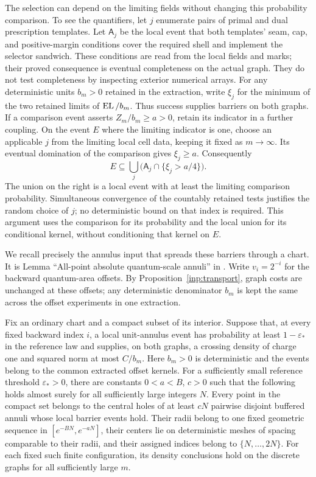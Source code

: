 The selection can depend on the limiting fields without changing
this probability comparison.  To see the quantifiers, let $j$
enumerate pairs of primal and dual prescription templates.  Let
$\mathsf A_j$ be the local event that both templates' seam, cap, and
positive-margin conditions cover the required shell and implement
the selector sandwich.
These conditions are read from the local fields and marks;
their proved consequence is eventual completeness on the actual
graph.  They do not test completeness by inspecting exterior
numerical arrays.  For any deterministic units $b_m>0$ retained
in the extraction, write $\xi_j$ for the minimum of the two
retained limits of $\operatorname{EL}/b_m$.  Thus success supplies barriers on
both graphs.  If a comparison event asserts
$Z_m/b_m\ge a>0$, retain its indicator in a further coupling.
On the event $E$ where the limiting indicator is one, choose
an applicable $j$ from the limiting local cell data, keeping it
fixed as $m\to\infty$.  Its eventual domination of the comparison
gives $\xi_j\ge a$.  Consequently
\[
 E\subseteq\bigcup_j\bigl(\mathsf A_j\cap\{\xi_j>a/4\}\bigr).
\]
The union on the right is a local event with at least the
limiting comparison probability.  Simultaneous convergence of
the countably retained tests justifies the random choice of
$j$; no deterministic bound on that index is required.  This
argument uses the comparison for its probability and the local
union for its conditional kernel, without conditioning that
kernel on $E$.

We recall precisely the annulus input that spreads these barriers
through a chart.  It is Lemma ``All-point absolute quantum-scale
annuli'' in \cite[Section ``Annuli at absolute quantum scales'']{MetricMaps}.
Write $v_i=2^{-i}$ for the backward quantum-area offsets.  By
Proposition~\ref{inp:transport}, graph costs are unchanged at these
offsets; any deterministic denominator $b_m$ is kept the same
across the offset experiments in one extraction.

\begin{lemma}\label{nd:coverage}
Fix an ordinary chart and a compact subset of its interior.  Suppose
that, at every fixed backward index $i$, a local unit-annulus event
has probability at least $1-\varepsilon_*$ in the reference law and
supplies, on both graphs, a crossing density of charge one and
squared norm at most $C/b_m$.  Here $b_m>0$ is deterministic and
the events belong to the common extracted offset kernels.
For a sufficiently small reference threshold $\varepsilon_*>0$,
there are constants $0<a<B$, $c>0$ such that the following holds
almost surely for all sufficiently large integers $N$.
Every point in the compact set belongs to the central holes of at
least $cN$ pairwise disjoint buffered annuli whose local barrier
events hold.  Their radii belong to one fixed geometric sequence
in $[e^{-BN},e^{-aN}]$, their centers lie on deterministic meshes
of spacing comparable to their radii, and their assigned indices
belong to $\{N,\ldots,2N\}$.
For each fixed such finite configuration, its density conclusions
hold on the discrete graphs for all sufficiently large $m$.
\end{lemma}

